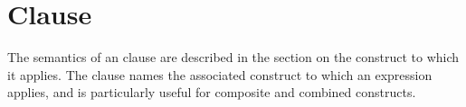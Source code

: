%
%
%
%
%
%
%
%
%
%
%
%
%


\section{ Clause}
\label{sec:if Clause}

\summary
The semantics of an  clause are described in the section on the
construct to which it applies.
The  clause  names the associated
construct to which an expression applies, and is particularly useful for
composite and combined constructs.

